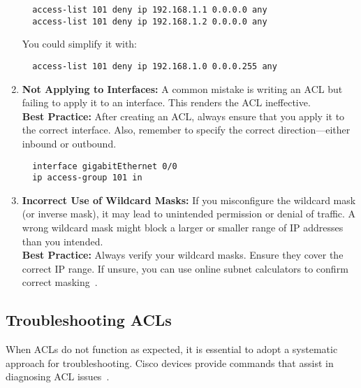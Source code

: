 \documentclass[11pt,a4paper]{article}
\begin{document}
\begin{enumerate}
\begin{lstlisting}
  access-list 101 deny ip 192.168.1.1 0.0.0.0 any
  access-list 101 deny ip 192.168.1.2 0.0.0.0 any                                                      
\end{lstlisting}

        You could simplify it with:

\begin{lstlisting}
  access-list 101 deny ip 192.168.1.0 0.0.0.255 any                                                     
\end{lstlisting}

        \item \textbf{Not Applying to Interfaces:} A common mistake is writing an ACL but failing to apply it to an interface. This renders the ACL ineffective.
        \\[1em]
        \textbf{Best Practice:} After creating an ACL, always ensure that you apply it to the correct interface. Also, remember to specify the correct direction—either inbound or outbound.
\begin{lstlisting}
  interface gigabitEthernet 0/0
  ip access-group 101 in                                                    
\end{lstlisting}

        \item \textbf{Incorrect Use of Wildcard Masks:} If you misconfigure the wildcard mask (or inverse mask), it may lead to unintended permission or denial of traffic. A wrong wildcard mask might block a larger or smaller range of IP addresses than you intended.
        \\[1em]
        \textbf{Best Practice:} Always verify your wildcard masks. Ensure they cover the correct IP range. If unsure, you can use online subnet calculators to confirm correct masking~\cite{}.

    \end{enumerate}

    \subsection*{Troubleshooting ACLs} When ACLs do not function as expected, it is essential to adopt a systematic approach for troubleshooting. Cisco devices provide commands that assist in diagnosing ACL issues~\cite{Troubleshooting}.
\end{document}
